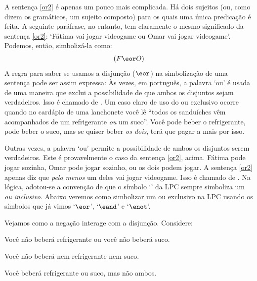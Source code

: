 A sentença \ref{or2} é apenas um pouco mais complicada.
Há dois sujeitos (ou, como dizem os gramáticos, um sujeito composto) para os quais uma única predicação é feita.
A seguinte paráfrase, no entanto, tem claramente o mesmo significado da sentença  \ref{or2}:
`Fátima vai jogar videogame ou Omar vai jogar videogame'.
Podemos, então, simbolizá-la como:
$$(F \eor O)$$
A regra para saber se usamos a disjunção ($\eor$) na simbolização de uma sentença pode ser assim expressa:
Às vezes, em português, a palavra `ou' é usada de uma maneira que exclui a possibilidade de que ambos os disjuntos sejam verdadeiros.
Isso é chamado de .
Um caso claro de uso do ou exclusivo ocorre quando no cardápio de uma lanchonete você lê ``todos os sanduíches vêm acompanhados de um refrigerante \emph{ou} um suco''.
Você pode beber o refrigerante, pode beber o suco, mas se quiser beber \emph{os dois}, terá que pagar a mais por isso.

Outras vezes, a palavra `ou' permite a possibilidade de ambos os disjuntos serem verdadeiros.
Este é provavelmente o caso da sentença \ref{or2}, acima.
Fátima pode jogar sozinha, Omar pode jogar sozinho, ou os dois podem jogar.
A sentença \ref{or2} apenas diz que \emph{pelo menos} um deles vai jogar videogame. Isso é chamado de .
Na lógica, adotou-se a convenção de que o símbolo `\eor' da LPC sempre simboliza um \emph{ou inclusivo}.
Abaixo veremos como simbolizar um ou exclusivo na LPC usando os símbolos que já vimos `$\eor$', `$\eand$' e `$\enot$'.

Vejamos como a negação interage com a disjunção. Considere:
	\begin{earg}
		\item[\ex{or3}] Você não beberá refrigerante ou você não beberá suco.
		\item[\ex{or4}] Você não beberá nem refrigerante nem suco.
		\item[\ex{or.xor}] Você beberá refrigerante ou suco, mas não ambos.
	\end{earg}

